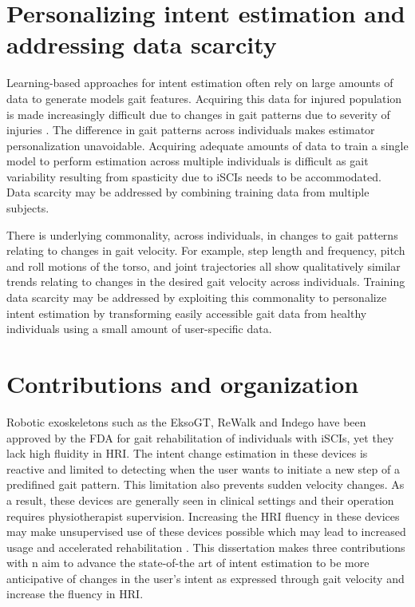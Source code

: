 \section{Personalizing intent estimation and addressing data scarcity}

Learning-based approaches for intent estimation often rely on large amounts of data to generate models gait features. Acquiring this data for injured population is made increasingly difficult due to changes in gait patterns due to severity of injuries \cite{sohn2018variability}. The difference in gait patterns across individuals makes estimator personalization unavoidable. Acquiring adequate amounts of data to train a single model to perform estimation across multiple individuals is difficult as gait variability resulting from spasticity due to iSCIs \cite{krawetz1996gait} needs to be accommodated. Data scarcity may be addressed by combining training data from multiple subjects.

There is underlying commonality, across individuals, in changes to gait patterns relating to changes in gait velocity. For example, step length and frequency, pitch and roll motions of the torso, and joint trajectories all show qualitatively similar trends relating to changes in the desired gait velocity across individuals. Training data scarcity may be addressed by exploiting this commonality to personalize intent estimation by transforming easily accessible gait data from healthy individuals using a small amount of user-specific data.

\section{Contributions and organization}

Robotic exoskeletons such as the EksoGT, ReWalk and Indego have been approved by the FDA for gait rehabilitation of individuals with iSCIs, yet they lack high fluidity in HRI. The intent change estimation in these devices is reactive and limited to detecting when the user wants to initiate a new step of a predifined gait pattern. This limitation also prevents sudden velocity changes. As a result, these devices are generally seen in clinical settings and their operation requires physiotherapist supervision. Increasing the HRI fluency in these devices may make unsupervised use of these devices possible which may lead to increased usage and accelerated rehabilitation \cite{hidler2011role}. This dissertation makes three contributions with n aim to advance the state-of-the art of intent estimation to be more anticipative of changes in the user's intent as expressed through gait velocity and increase the fluency in HRI.

